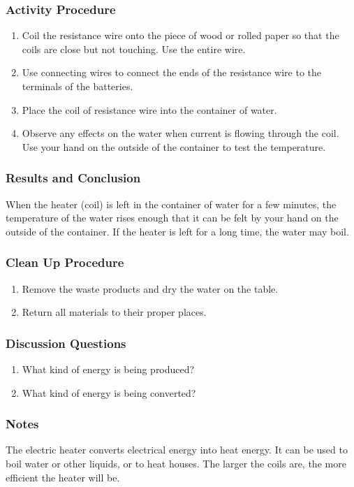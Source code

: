 \subsubsection*{Activity Procedure}
\begin{enumerate}
\item{Coil the resistance wire onto the piece of wood or rolled paper so that the coils are close but not touching. Use the entire wire.} 
\item{Use connecting wires to connect the ends of the resistance wire to the terminals of the batteries.} 
\item{Place the coil of resistance wire into the container of water.} 
\item{Observe any effects on the water when current is flowing through the coil. Use your hand on the outside of the container to test the temperature.} 
\end{enumerate}

\subsubsection*{Results and Conclusion}
When the heater (coil) is left in the container of water for a few minutes, the temperature of the water rises enough that it can be felt by your hand on the outside of the container. If the heater is left for a long time, the water may boil.  

\subsubsection*{Clean Up Procedure}
\begin{enumerate}
\item{Remove the waste products and dry the water on the table.} 
\item{Return all materials to their proper places.} 
\end{enumerate}

\subsubsection*{Discussion Questions}
\begin{enumerate}
\item{What kind of energy is being produced?}
\item{What kind of energy is being converted?}
\end{enumerate}

\subsubsection*{Notes}
The electric heater converts electrical energy into heat energy. It can be used to boil water or other liquids, or to heat houses. The larger the coils are, the more efficient the heater will be.  


